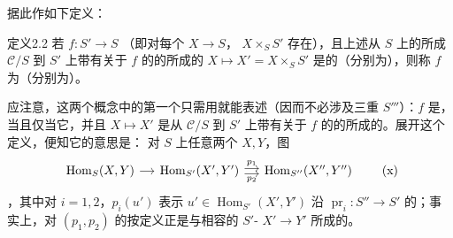 据此作如下定义：
\begin{SGAresult}{定义}{2.2}
若 $f:S'\to S$ （即对每个 $X\to S$， $X\times_S S'$ 存在），且上述从 $S$ 上的所成 $\mathcal C/S$ 到 $S'$ 上带有关于 $f$ 的的所成的 $X\mapsto X'=X\times_S S'$ 是的（分别为），则称 $f$ 为（分别为）。
\end{SGAresult}
应注意，这两个概念中的第一个只需用就能表述（因而不必涉及三重 $S'''$）：$f$ 是，当且仅当它，并且 $X\mapsto X'$ 是从 $\mathcal C/S$ 到 $S'$ 上带有关于 $f$ 的的所成的。展开这个定义，便知它的意思是：
对 $S$ 上任意两个 $X,Y$，图
\[
\begin{tikzcd}[column sep=small]
\operatorname{Hom}_S(X,Y)\arrow[r]&\operatorname{Hom}_{S'}(X',Y')\arrow[r,shift left=.5ex,"p_1"]\arrow[r,shift right=.5ex,"p_2"']&\operatorname{Hom}_{S''}(X'',Y'')
\end{tikzcd}\tag{x}
\]
，其中对 $i=1,2$，$p_i(u')$ 表示 $u'\in\operatorname{Hom}_{S'}(X',Y')$ 沿 $\operatorname{pr}_i:S''\to S'$ 的；事实上，对 $(p_1,p_2)$ 的按定义正是与相容的 $S'$- $X'\to Y'$ 所成的。

